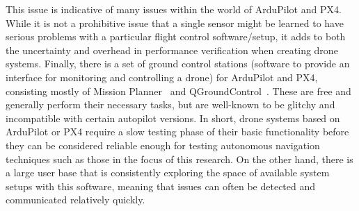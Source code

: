 This issue is indicative of many issues within the world of ArduPilot and PX4.
While it is not a prohibitive issue that a single sensor might be learned to have serious problems with a particular flight control software/setup,
it adds to both the uncertainty and overhead in performance verification when creating drone systems.
Finally, there is a set of ground control stations (software to provide an interface for monitoring and controlling a drone)
for ArduPilot and PX4, consisting mostly of Mission Planner~\cite{mission_planner} and QGroundControl~\cite{qgroundcontrol}.
These are free and generally perform their necessary tasks, but are well-known to be glitchy
and incompatible with certain autopilot versions.
In short, drone systems based on ArduPilot or PX4 require a slow testing phase of their basic functionality
before they can be considered reliable enough for testing autonomous navigation techniques such as those in the focus of this research.
On the other hand, there is a large user base that is consistently exploring the space of available system setups with this software,
meaning that issues can often be detected and communicated relatively quickly.

